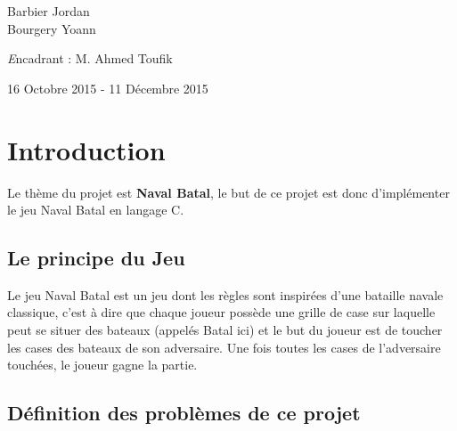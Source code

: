 \documentclass[11pt]{article}
\begin{document}
\begin{titlepage}
\begin{sffamily}
\begin{center}
      \vspace{0.5cm}
      \begin{minipage}{0.4\textwidth}
          \begin{flushleft}
            \begin{large}
              Barbier Jordan\\
              Bourgery Yoann\\
            \end{large}
          \end{flushleft}
        \end{minipage}
        \begin{minipage}{0.4\textwidth}
            \begin{flushright}
              \begin{large}
                {\textit Encadrant : M. Ahmed Toufik}
              \end{large}
            \end{flushright}
        \end{minipage}
        \vfill
        {\large 16 Octobre 2015 - 11 Décembre 2015}
    \end{center}
  \end{sffamily}
\end{titlepage}
\newpage
\tableofcontents
\newpage
\section{Introduction}

Le thème du projet est \textbf{Naval Batal}, le but de ce projet est donc d'implémenter le jeu Naval Batal en langage C. 

\subsection{Le principe du Jeu}

Le jeu Naval Batal est un jeu dont les règles sont inspirées d'une bataille navale classique, c'est à dire que chaque joueur possède une grille de case sur laquelle peut se situer des bateaux (appelés Batal ici) et le but du joueur est de toucher les cases des bateaux de son adversaire. Une fois toutes les cases de l'adversaire touchées, le joueur gagne la partie.

\subsection{Définition des problèmes de ce projet}
\end{document}
